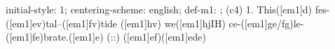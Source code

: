 initial-style: 1;
centering-scheme: english;
def-m1: \grealign;
(c4) 1. This([em1]d) fes-([em1]ev)tal--([em1]fv)tide ([em1]hv) we([em1]hjIH) ce-([em1]ge/fg)le-([em1]fe)brate.([em1]e) (::) ([em1]ef)([em1]ede)